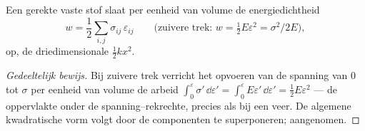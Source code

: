 \begin{proposition}\label{prop:b3:continuum-elasticity:energy}
Een gerekte vaste stof slaat per eenheid van volume de energiedichtheid
\[
w = \frac12\sum_{i,j}\sigma_{ij}\,\varepsilon_{ij}
\qquad\text{(zuivere trek: } w = \tfrac12 E\varepsilon^2 =
\sigma^2/2E\text{)} ,
\]
op, de driedimensionale $\tfrac12 kx^2$.
\end{proposition}

\begin{proof}[Gedeeltelijk bewijs]
Bij zuivere trek verricht het opvoeren van de spanning van $0$ tot
$\sigma$ per eenheid van volume de arbeid
$\int_0^\varepsilon\sigma'\,\dd\varepsilon' =
\int_0^\varepsilon E\varepsilon'\,\dd\varepsilon' = \tfrac12
E\varepsilon^2$ --- de oppervlakte onder de spanning--rekrechte, precies
als bij een veer. De algemene kwadratische vorm volgt door de componenten
te superponeren; aangenomen.
\end{proof}


